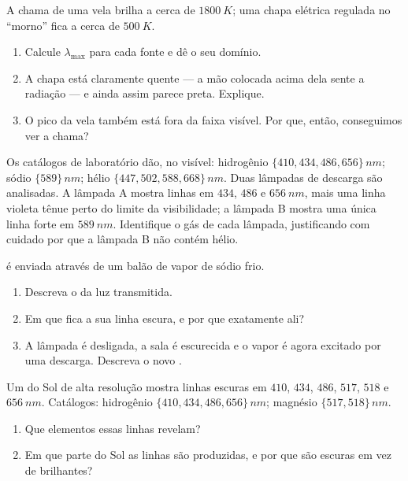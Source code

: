 \begin{exercise}[$\star\star$]\label{exo:g10:light-spectra:7}
A chama de uma vela brilha a cerca de $\qty{1800}{K}$; uma chapa elétrica
regulada no ``morno'' fica a cerca de $\qty{500}{K}$.
\begin{enumerate}
  \item Calcule $\lambda_{\max}$ para cada fonte e dê o seu domínio.
  \item A chapa está claramente quente --- a mão colocada acima dela sente a
        radiação --- e ainda assim parece preta. Explique.
  \item O pico da vela também está fora da faixa visível. Por que, então,
        conseguimos ver a chama?
\end{enumerate}
\end{exercise}

\begin{exercise}[$\star\star$]\label{exo:g10:light-spectra:8}
Os catálogos de laboratório dão, no visível: hidrogênio
$\{410, 434, 486, 656\}\,\unit{nm}$; sódio $\{589\}\,\unit{nm}$; hélio
$\{447, 502, 588, 668\}\,\unit{nm}$. Duas lâmpadas de descarga são
analisadas. A lâmpada A mostra linhas em $434$, $486$ e $\qty{656}{nm}$,
mais uma linha violeta tênue perto do limite da visibilidade; a lâmpada B
mostra uma única linha forte em $\qty{589}{nm}$. Identifique o gás de cada
lâmpada, justificando com cuidado por que a lâmpada B não contém hélio.
\end{exercise}

\begin{exercise}[$\star\star$]\label{exo:g10:light-spectra:9}
 é enviada através de um balão de vapor de sódio frio.
\begin{enumerate}
  \item Descreva o  da luz transmitida.
  \item Em que  fica a sua linha escura, e por que
        exatamente ali?
  \item A lâmpada é desligada, a sala é escurecida e o vapor é agora
        excitado por uma descarga. Descreva o novo .
\end{enumerate}
\end{exercise}

\begin{exercise}[$\star\star$]\label{exo:g10:light-spectra:10}
Um  do Sol de alta resolução mostra linhas escuras em $410$, $434$,
$486$, $517$, $518$ e $\qty{656}{nm}$. Catálogos: hidrogênio
$\{410, 434, 486, 656\}\,\unit{nm}$; magnésio $\{517, 518\}\,\unit{nm}$.
\begin{enumerate}
  \item Que elementos essas linhas revelam?
  \item Em que parte do Sol as linhas são produzidas, e por que são escuras
        em vez de brilhantes?
\end{enumerate}
\end{exercise}

